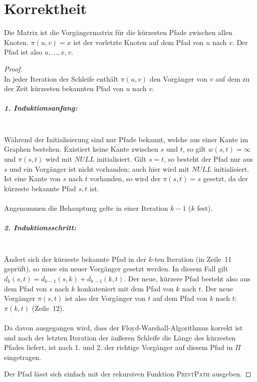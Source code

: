 \documentclass[a4paper]{scrartcl}
\begin{document}
\section*{Korrektheit}
\begin{behaupt}
    Die Matrix ist die Vorgängermatrix für die kürzesten Pfade zwischen allen
    Knoten.
    $\pi(u,v) = x$ ist der vorletzte Knoten auf dem Pfad von $u$ nach $v$.
    Der Pfad ist also $u, \ldots, x, v$.
\end{behaupt}
\begin{proof} \hfill \\
    In jeder Iteration der Schleife enthält $\pi(u,v)$ den Vorgänger von $v$ auf
    dem zu der Zeit kürzesten bekannten Pfad von $u$ nach $v$.

    \subparagraph{1. Induktionsanfang:} \hfill \\
    Während der Initialisierung sind nur Pfade bekannt, welche aus einer Kante
    im Graphen bestehen.
    Existiert keine Kante zwischen $s$ und $t$, so gilt $w(s,t) = \infty$ und
    $\pi(s,t)$ wird mit $NULL$ initialisiert.
    Gilt $s = t$, so besteht der Pfad nur aus $s$ und ein Vorgänger ist nicht
    vorhanden; auch hier wird mit $NULL$ initialisiert.
    Ist eine Kante von $s$ nach $t$ vorhanden, so wird der $\pi(s,t) = s$
    gesetzt, da der kürzeste bekannte Pfad $s, t$ ist.
    \\
    \\
    Angenommen die Behauptung gelte in einer Iteration $k-1$ ($k$ fest).

    \subparagraph{2. Induktionsschritt:} \hfill \\
    Ändert sich der kürzeste bekannte Pfad in der $k$-ten Iteration
    (in Zeile~11 geprüft), so muss ein neuer Vorgänger gesetzt werden.
    In diesem Fall gilt $d_k(s,t) = d_{k-1}(s,k) + d_{k-1}(k,t)$.
    Der neue, kürzere Pfad besteht also aus dem Pfad von $s$ nach $k$
    konkateniert mit dem Pfad von $k$ nach $t$.
    Der neue Vorgänger $\pi(s,t)$ ist also der Vorgänger von $t$ auf dem Pfad
    von $k$ nach $t$: $\pi(k,t)$ (Zeile~12).
    \\
    \\
    Da davon ausgegangen wird, dass der Floyd-Warshall-Algorithmus korrekt ist
    und nach der letzten Iteration der äußeren Schleife die Länge des kürzesten
    Pfades liefert, ist nach 1. und 2. der richtige Vorgänger auf diesem Pfad
    in $\Pi$ eingetragen.

    Der Pfad lässt sich einfach mit der rekursiven Funktion \textsc{PrintPath}
    ausgeben.


\end{proof}
\end{document}
